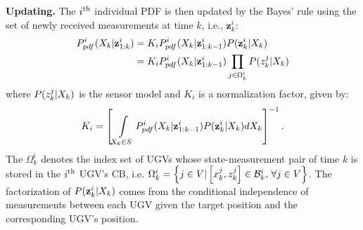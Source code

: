 	\textbf{Updating.}
	The $i^\text{th}$ individual PDF is then updated by the Bayes' rule using the set of newly received measurements at time $k$, i.e., $\mathbf{z}^i_k$:
		\small\begin{align}\label{eqn:bayes_upd}
			\begin{split}
				P^i_{pdf}(X_k|\mathbf{z}^i_{1:k})
				&= K_iP^i_{pdf}(X_k|\mathbf{z}^i_{1:k-1})P(\mathbf{z}^i_k|X_k)\\
				&=K_iP^i_{pdf}(X_k|\mathbf{z}^i_{1:k-1})\prod\limits_{j\in\Omega^i_k}P(z^j_k|X_{k})
			\end{split}
		\end{align}\normalsize
	where $P(z^j_k|X_k)$ is the sensor model and $K_i$ is a normalization factor, given by:
	\small\begin{align*}
	K_i=\left[\int\limits_{X_k\in S} P^i_{pdf}(X_k|\mathbf{z}^i_{1:k-1})P(\mathbf{z}^i_k|X_k)dX_k\right]^{-1}.
	\end{align*}\normalsize
	The $\Omega^i_k$ denotes the index set of UGVs whose state-measurement pair of time $k$ is stored in the $i^\text{th}$ UGV's CB, i.e. $\Omega^i_k=\left\lbrace j\in V | \left[x^j_k,z^j_k\right]\in \mathcal{B}^i_k,\, \forall j\in V\right\rbrace$.
	The factorization of $P(\mathbf{z}^i_k|X_k)$ comes from the conditional independence of measurements between each UGV given the target position and the corresponding UGV's position.	
	

